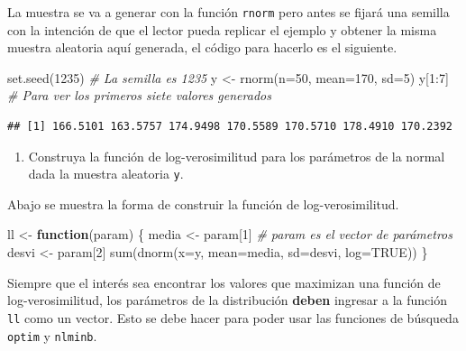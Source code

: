 \documentclass[
]{book}
\makeatletter
\newenvironment{Shaded}{\begin{snugshade}}{\end{snugshade}}
\newcommand{\AttributeTok}[1]{\textcolor[rgb]{0.77,0.63,0.00}{#1}}
\newcommand{\CommentTok}[1]{\textcolor[rgb]{0.56,0.35,0.01}{\textit{#1}}}
\newcommand{\ConstantTok}[1]{\textcolor[rgb]{0.00,0.00,0.00}{#1}}
\newcommand{\ControlFlowTok}[1]{\textcolor[rgb]{0.13,0.29,0.53}{\textbf{#1}}}
\newcommand{\DecValTok}[1]{\textcolor[rgb]{0.00,0.00,0.81}{#1}}
\newcommand{\FunctionTok}[1]{\textcolor[rgb]{0.00,0.00,0.00}{#1}}
\newcommand{\NormalTok}[1]{#1}
\newcommand{\OtherTok}[1]{\textcolor[rgb]{0.56,0.35,0.01}{#1}}
\newcommand{\SpecialCharTok}[1]{\textcolor[rgb]{0.00,0.00,0.00}{#1}}
\providecommand{\tightlist}{%
  \setlength{\itemsep}{0pt}\setlength{\parskip}{0pt}}
\newenvironment{kframe}{%
\medskip{}
\setlength{\fboxsep}{.8em}
 \def\at@end@of@kframe{}%
 \ifinner\ifhmode%
  \def\at@end@of@kframe{\end{minipage}}%
  \begin{minipage}{\columnwidth}%
 \fi\fi%
 \def\FrameCommand##1{\hskip\@totalleftmargin \hskip-\fboxsep
 \colorbox{shadecolor}{##1}\hskip-\fboxsep
     \hskip-\linewidth \hskip-\@totalleftmargin \hskip\columnwidth}%
 \MakeFramed {\advance\hsize-\width
   \@totalleftmargin\z@ \linewidth\hsize
   \@setminipage}}%
 {\par\unskip\endMakeFramed%
 \at@end@of@kframe}
\renewenvironment{Shaded}{\begin{kframe}}{\end{kframe}}
\newenvironment{rmdblock}[1]
  {
  \begin{itemize}
  \renewcommand{\labelitemi}{
    \raisebox{-.7\height}[0pt][0pt]{
      {\setkeys{Gin}{width=3em,keepaspectratio}\texttt{[image: images/\#1]}}
    }
  }
  \setlength{\fboxsep}{1em}
  \begin{kframe}
  \item
  }
  {
  \end{kframe}
  \end{itemize}
  }
\newenvironment{rmdwarning}
  {\begin{rmdblock}{warning}}
  {\end{rmdblock}}
\makeatother
\begin{document}
La muestra se va a generar con la función \texttt{rnorm} pero antes se fijará una semilla con la intención de que el lector pueda replicar el ejemplo y obtener la misma muestra aleatoria aquí generada, el código para hacerlo es el siguiente.

\begin{Shaded}
\begin{Highlighting}[]
\FunctionTok{set.seed}\NormalTok{(}\DecValTok{1235}\NormalTok{)  }\CommentTok{\# La semilla es 1235}
\NormalTok{y }\OtherTok{\textless{}{-}} \FunctionTok{rnorm}\NormalTok{(}\AttributeTok{n=}\DecValTok{50}\NormalTok{, }\AttributeTok{mean=}\DecValTok{170}\NormalTok{, }\AttributeTok{sd=}\DecValTok{5}\NormalTok{)}
\NormalTok{y[}\DecValTok{1}\SpecialCharTok{:}\DecValTok{7}\NormalTok{]  }\CommentTok{\# Para ver los primeros siete valores generados}
\end{Highlighting}
\end{Shaded}

\begin{verbatim}
## [1] 166.5101 163.5757 174.9498 170.5589 170.5710 178.4910 170.2392
\end{verbatim}

\begin{enumerate}
\def\labelenumi{\arabic{enumi})}
\tightlist
\item
  Construya la función de log-verosimilitud para los parámetros de la normal dada la muestra aleatoria \texttt{y}.
\end{enumerate}

Abajo se muestra la forma de construir la función de log-verosimilitud.

\begin{Shaded}
\begin{Highlighting}[]
\NormalTok{ll }\OtherTok{\textless{}{-}} \ControlFlowTok{function}\NormalTok{(param) \{}
\NormalTok{  media }\OtherTok{\textless{}{-}}\NormalTok{ param[}\DecValTok{1}\NormalTok{]  }\CommentTok{\# param es el vector de parámetros}
\NormalTok{  desvi }\OtherTok{\textless{}{-}}\NormalTok{ param[}\DecValTok{2}\NormalTok{] }
  \FunctionTok{sum}\NormalTok{(}\FunctionTok{dnorm}\NormalTok{(}\AttributeTok{x=}\NormalTok{y, }\AttributeTok{mean=}\NormalTok{media, }\AttributeTok{sd=}\NormalTok{desvi, }\AttributeTok{log=}\ConstantTok{TRUE}\NormalTok{))}
\NormalTok{\}}
\end{Highlighting}
\end{Shaded}

\begin{rmdwarning}
Siempre que el interés sea encontrar los valores que maximizan una función de log-verosimilitud, los parámetros de la distribución \textbf{deben} ingresar a la función \texttt{ll} como un vector. Esto se debe hacer para poder usar las funciones de búsqueda \texttt{optim} y \texttt{nlminb}.
\end{rmdwarning}
\end{document}
